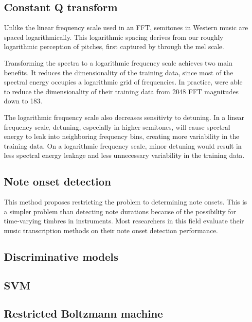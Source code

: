 \documentclass[5p]{elsarticle}
\begin{document}
\subsection{Constant Q transform}
Unlike the linear frequency scale used in an FFT, semitones in Western music are spaced logarithmically. This logarithmic spacing derives from our roughly logarithmic perception of pitches, first captured by \citet{stevens1937scale} through the mel scale.

Transforming the spectra to a logarithmic frequency scale achieves two main benefits. It reduces the dimensionality of the training data, since most of the spectral energy occupies a logarithmic grid of frequencies. In practice, \citet{bock2012polyphonic} were able to reduce the dimensionality of their training data from 2048 FFT magnitudes down to 183.

The logarithmic frequency scale also decreases sensitivty to detuning. In a linear frequency scale, detuning, especially in higher semitones, will cause spectral energy to leak into neighboring frequency bins, creating more variability in the training data. On a logarithmic frequency scale, minor detuning would result in less spectral energy leakage and less unnecessary variability in the training data.

\subsection{Note onset detection}
This method proposes restricting the problem to determining note onsets. This is a simpler problem than detecting note durations because of the possibility for time-varying timbres in instruments. Most researchers in this field evaluate their music transcription methods on their note onset detection performance.

\subsection{Discriminative models}
\subsection{SVM}

\citet{poliner2006discriminative}



\subsection{Restricted Boltzmann machine}
\end{document}
